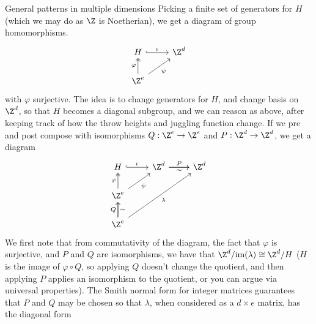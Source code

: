 \documentclass[12nt]{article}
\theoremstyle{plain}
\begin{document}
\begin{subsection}{General patterns in multiple dimensions}
Picking a finite set of generators for $H$ (which we may do as $\Z$ is Noetherian), we get a diagram of group homomorphisms. 
\[
\begin{tikzcd}
H  \ar[r, hookrightarrow, "\iota"] & \Z^d \\
\Z^e \ar[u, twoheadrightarrow, "\varphi"] \ar[ur, "\psi"']
\end{tikzcd}
\]
with $\varphi$ surjective. The idea is to change generators for $H$, and change basis on $\Z^d$, so that $H$ becomes a diagonal subgroup, and we can reason as above, after keeping track of how the throw heights and juggling function change. If we pre and post compose with isomorphisms $Q : \Z^e \to \Z^e$ and $P : \Z^d \to \Z^d$, we get a diagram
\[
\begin{tikzcd}
H  \ar[r, hookrightarrow, "\iota"] & \Z^d \ar[r, "P"] \ar[r, "\sim"'] & \Z^d \\
\Z^e \ar[u, twoheadrightarrow, "\varphi"] \ar[ur, "\psi"'] \\
\Z^e \ar[u, "Q"] \ar[u, "\sim"'] \ar[uurr, "\lambda"']
\end{tikzcd}
\]
We first note that from commutativity of the diagram, the fact that $\varphi$ is surjective, and $P$ and $Q$ are isomorphisms, we have that $\Z^d/\text{im}(\lambda) \cong \Z^d/H$ ($H$ is the image of $\varphi \circ Q$, so applying $Q$ doesn't change the quotient, and then applying $P$ applies an isomorphism to the quotient, or you can argue via universal properties). The Smith normal form for integer matrices guarantees that $P$ and $Q$ may be chosen so that $\lambda$, when considered as a $d \times e$ matrix, has the diagonal form 


\end{subsection}
\end{document}
